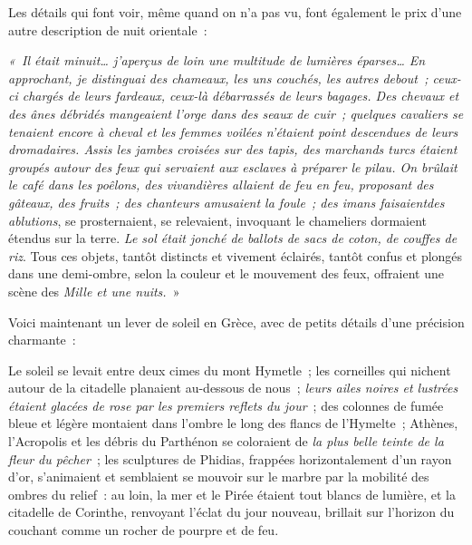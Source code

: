 \documentclass[french,twoside]{book} %
\newenvironment{quoteblock}%
  {\begin{quoting}}
  {\end{quoting}}
\newenvironment{quotebar}{%
    \def\FrameCommand{{\color{rubric!10!}\vrule width 0.5em} \hspace{0.9em}}%
    \def\OuterFrameSep{\itemsep} %
    \MakeFramed {\advance\hsize-\width \FrameRestore}
  }%
  {%
    \endMakeFramed
  }
\renewenvironment{quoteblock}%
  {%
    \savenotes
    \setstretch{0.9}
    \normalfont
    \begin{quotebar}
  }
  {%
    \end{quotebar}
    \spewnotes
  }
\begin{document}
\noindent Les détails qui font voir, même quand on n’a pas vu, font également le prix d’une autre description de nuit orientale :\par

\begin{quoteblock}
 \noindent \emph{« Il était minuit… j’aperçus de loin une multitude de lumières éparses… En approchant, je distinguai des chameaux, les uns couchés, les autres debout ; ceux-ci chargés de leurs fardeaux, ceux-là débarrassés de leurs bagages. \emph{Des chevaux et des ânes débridés mangeaient l’orge dans des seaux de cuir} ; quelques cavaliers se tenaient encore à cheval et les femmes voilées n’étaient point descendues de leurs dromadaires. \emph{Assis les jambes croisées sur des tapis}, des marchands turcs étaient groupés autour des feux qui servaient aux esclaves à \emph{préparer le pilau}. \emph{On brûlait le café dans les poêlons, des vivandières allaient de feu en feu}, proposant des gâteaux, des fruits ; des chanteurs amusaient la foule ; \emph{des imans} faisaient}\emph{des ablutions}, se prosternaient, se relevaient, invoquant le chameliers dormaient étendus sur la terre. \emph{Le sol était jonché de ballots de sacs de coton, de couffes de riz}. Tous ces objets, tantôt distincts et vivement éclairés, tantôt confus et plongés dans une demi-ombre, selon la couleur et le mouvement des feux, offraient une scène des \emph{Mille et une nuits.} »
 \end{quoteblock}

\noindent Voici maintenant un lever de soleil en Grèce, avec de petits détails d’une précision charmante :\par

\begin{quoteblock}
 \noindent Le soleil se levait entre deux cimes du mont Hymetle ; les corneilles qui nichent autour de la citadelle planaient au-dessous de nous ; \emph{leurs ailes noires et lustrées étaient glacées de rose par les premiers reflets du jour} ; des colonnes de fumée bleue et légère montaient dans l’ombre le long des flancs de l’Hymelte ; Athènes, l’Acropolis et les débris du Parthénon se coloraient de \emph{la plus belle teinte de la fleur du pêcher} ; les sculptures de Phidias, frappées horizontalement d’un rayon d’or, s’animaient et semblaient se mouvoir sur le marbre par la mobilité des ombres du relief : au loin, la mer et le Pirée étaient tout blancs de lumière, et la citadelle de Corinthe, renvoyant l’éclat du jour nouveau, brillait sur l’horizon du couchant comme un rocher de pourpre et de feu.
 \end{quoteblock}
\end{document}
